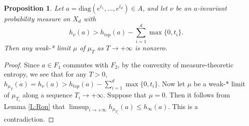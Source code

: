 \documentclass[reqno,12pt]{amsart}
\newtheorem{proposition}[theorem]{Proposition}
\theoremstyle{definition}
\numberwithin{equation}{section}
\newcommand{\diag}{\mathrm{diag}}
\newcommand {\new}[1]   {\textcolor{blue}{#1}}
\newcommand {\comm}[1]   {\textcolor{red}{#1}}
\newcommand {\neww}[1]   {\textcolor{purple}{#1}}
\begin{document}
{\begin{proposition}\label{nonzero}
	Let $a=\diag(e^{t_1},\dots,e^{t_d})\in A$, and let $\nu$ be an $a$-invariant probability measure on $X_d$ with $$h_{\nu}(a)>h_{top}(a)-\sum_{i=1}^d\max\{0,t_i\}.$$ Then any weak-* limit $\mu$ of 
	$\mu_T$ as $T\to +\infty$ is nonzero.
\end{proposition}
\begin{proof}
    Since $a\in F_1$ commutes with $F_2$, by the convexity of measure-theoretic entropy, we see that for any $T>0$, $h_{\mu_T}(a)=h_{\nu}(a)>h_{top}(a)-\sum_{i=1}^d\max\{0,t_i\}.$ 
    {Now let $\mu$ be a weak-* limit of $\mu_{T_i}$ along a sequence $T_i\to +\infty$. Suppose that $\mu=0$. Then it follows from Lemma \ref{L:Ron} that $\limsup_{i\to +\infty}h_{\mu_{T_i}}(a)\leq h_{\infty}(a)$. This is a contradiction.}
\end{proof}

}
\end{document}
